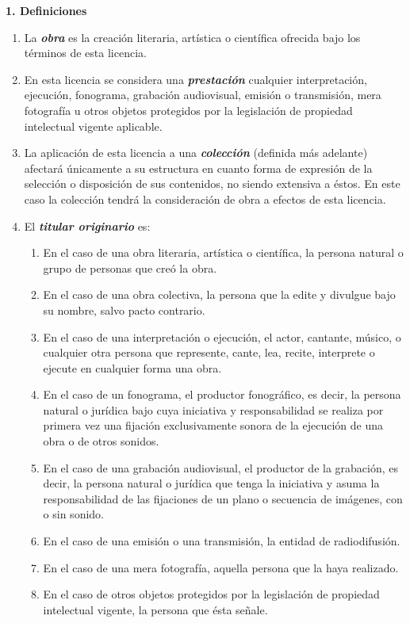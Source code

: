         \par \textbf{1. Definiciones}

        \begin{enumerate}
          \item La \textbf{\emph{obra}} es la creación literaria, artística o científica ofrecida bajo los términos de esta licencia.

          \item En esta licencia se considera  una \textbf{\emph{prestación}} cualquier interpretación, ejecución, fonograma, grabación audiovisual, emisión o transmisión, mera fotografía u otros objetos protegidos por la legislación de propiedad intelectual vigente aplicable.

          \item La aplicación de esta licencia a una \textbf{\emph{colección}} (definida más adelante) afectará únicamente a su estructura en cuanto forma de expresión de la selección o disposición de sus contenidos, no siendo extensiva a éstos. En este caso la colección tendrá la consideración de obra a efectos de esta licencia.

          \item El \textbf{\emph{titular originario}} es: 
        \begin{enumerate}
          \item En el caso de una obra literaria, artística o científica, la persona natural o grupo de personas que creó la obra.
          \item En el caso de una obra colectiva, la persona que la edite y divulgue bajo su nombre, salvo pacto contrario.
          \item En el caso de una interpretación o ejecución, el actor, cantante, músico, o cualquier otra persona que represente, cante, lea, recite, interprete o ejecute en cualquier forma una obra. 
          \item En el caso de un fonograma, el productor fonográfico, es decir, la persona natural o jurídica bajo cuya iniciativa y responsabilidad se realiza por primera vez una fijación exclusivamente sonora de la ejecución de una obra o de otros sonidos.
          \item En el caso de una grabación audiovisual, el productor de la grabación, es decir, la persona natural o jurídica que tenga la iniciativa y asuma la responsabilidad de las fijaciones de un plano o secuencia de imágenes, con o sin sonido.
          \item En el caso de una emisión o una transmisión, la entidad de radiodifusión.
          \item En el caso de una mera fotografía, aquella persona que la haya realizado.
          \item En el caso de otros objetos protegidos por la legislación de propiedad intelectual vigente, la persona que ésta señale.
\end{enumerate}



\end{enumerate}
